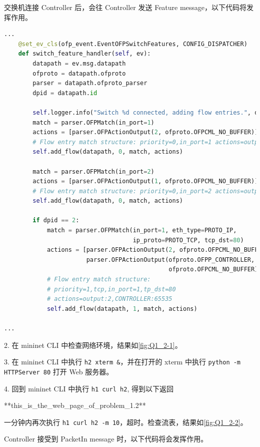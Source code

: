 \documentclass[format=draft,language=chinese,category=SDN]{hustreport}
\newcommand{\code}{\texttt}
\begin{document}
交换机连接 Controller 后，会往 Controller 发送 Feature message，以下代码将发挥作用。

\begin{lstlisting}[language=python]
...
    @set_ev_cls(ofp_event.EventOFPSwitchFeatures, CONFIG_DISPATCHER)
    def switch_feature_handler(self, ev):
        datapath = ev.msg.datapath
        ofproto = datapath.ofproto
        parser = datapath.ofproto_parser
        dpid = datapath.id

        self.logger.info("Switch %d connected, adding flow entries.", dpid)
        match = parser.OFPMatch(in_port=1)
        actions = [parser.OFPActionOutput(2, ofproto.OFPCML_NO_BUFFER)]
        # Flow entry match structure: priority=0,in_port=1 actions=output:2
        self.add_flow(datapath, 0, match, actions)

        match = parser.OFPMatch(in_port=2)
        actions = [parser.OFPActionOutput(1, ofproto.OFPCML_NO_BUFFER)]
        # Flow entry match structure: priority=0,in_port=2 actions=output:1
        self.add_flow(datapath, 0, match, actions)

        if dpid == 2:
            match = parser.OFPMatch(in_port=1, eth_type=PROTO_IP,
                                    ip_proto=PROTO_TCP, tcp_dst=80)
            actions = [parser.OFPActionOutput(2, ofproto.OFPCML_NO_BUFFER),
                       parser.OFPActionOutput(ofproto.OFPP_CONTROLLER,
                                              ofproto.OFPCML_NO_BUFFER)]
            # Flow entry match structure:
            # priority=1,tcp,in_port=1,tp_dst=80
            # actions=output:2,CONTROLLER:65535
            self.add_flow(datapath, 1, match, actions)

...
\end{lstlisting}

2. 在 mininet CLI 中检查网络环境，结果如\autoref{fig:Q1_2-1}。

3. 在 mininet CLI 中执行 \code{h2 xterm \&}，并在打开的 xterm 中执行 \code{python -m HTTPServer 80} 打开 Web 服务器。

4. 回到 mininet CLI 中执行 \code{h1 curl h2}, 得到以下返回
\begin{center}
**this\_is\_the\_web\_page\_of\_problem\_1.2**
\end{center}
一分钟内再次执行 \code{h1 curl h2 -m 10}，超时。检查流表，结果如\autoref{fig:Q1_2-2}。

Controller 接受到 PacketIn message 时，以下代码将会发挥作用。
\end{document}
